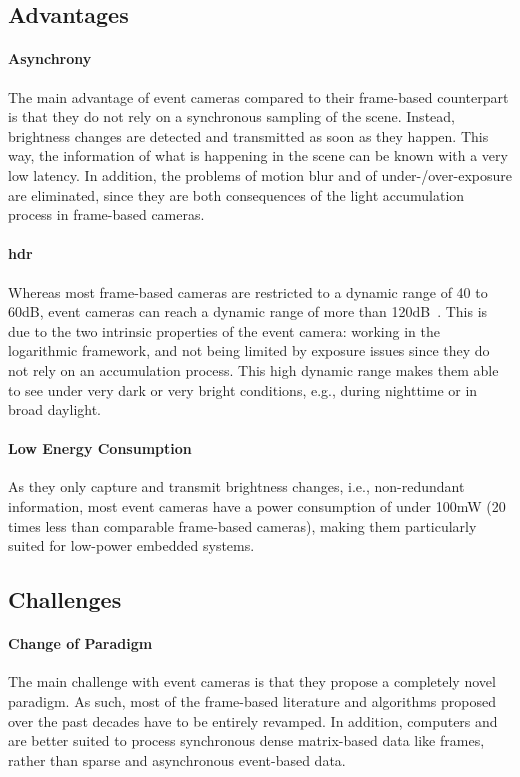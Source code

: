 \subsection{Advantages}

\paragraph{Asynchrony}
The main advantage of event cameras compared to their frame-based counterpart is that they do not rely on a synchronous sampling of the scene. Instead, brightness changes are detected and transmitted as soon as they happen. This way, the information of what is happening in the scene can be known with a very low latency. In addition, the problems of motion blur and of under-/over-exposure are eliminated, since they are both consequences of the light accumulation process in frame-based cameras.

\paragraph{\acrfull{hdr}}
Whereas most frame-based cameras are restricted to a dynamic range of 40 to 60dB, event cameras can reach a dynamic range of more than 120dB~\cite{Finateu2020510A1}. This is due to the two intrinsic properties of the event camera: working in the logarithmic framework, and not being limited by exposure issues since they do not rely on an accumulation process. This high dynamic range makes them able to see under very dark or very bright conditions, e.g., during nighttime or in broad daylight.

\paragraph{Low Energy Consumption}
As they only capture and transmit brightness changes, i.e., non-redundant information, most event cameras have a power consumption of under 100mW (20 times less than comparable frame-based cameras), making them particularly suited for low-power embedded systems.

\subsection{Challenges}

\paragraph{Change of Paradigm}\label{sec:evtcams:adv_chall:chall:paradigm}
The main challenge with event cameras is that they propose a completely novel paradigm. As such, most of the frame-based literature and algorithms proposed over the past decades have to be entirely revamped. In addition, computers and  are better suited to process synchronous dense matrix-based data like frames, rather than sparse and asynchronous event-based data.


